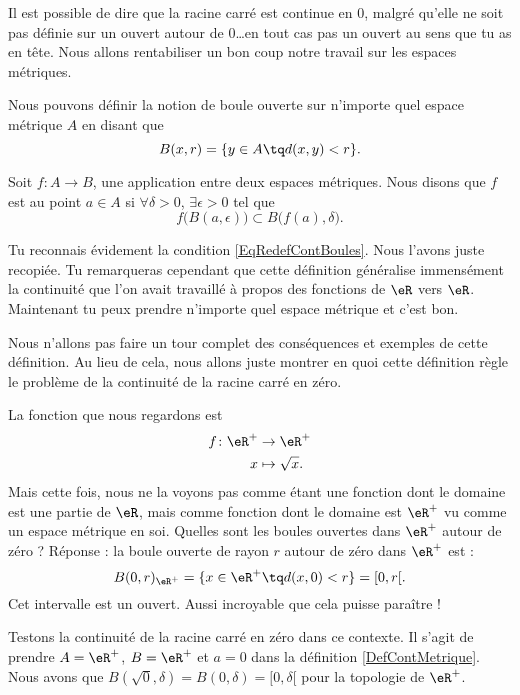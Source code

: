 Il est possible de dire que la racine carré est continue en $0$, malgré qu'elle ne soit pas définie sur un ouvert autour de $0$\ldots en tout cas pas un ouvert au sens que tu as en tête. Nous allons rentabiliser un bon coup notre travail sur les espaces métriques.

Nous pouvons définir la notion de boule ouverte sur n'importe quel espace métrique $A$ en disant que
\[ 
  B(x,r)=\{ y\in A\tq d(x,y)<r \}.
\]
\begin{definition}      \label{DefContMetrique}
Soit $f\colon A\to B$, une application entre deux espaces métriques. Nous disons que $f$ est  au point $a\in A$ si $\forall \delta>0$, $\exists\epsilon>0$ tel que 
\begin{equation}
  f\big( B(a,\epsilon) \big)\subset B\big( f(a),\delta \big).
\end{equation}
\end{definition}
Tu reconnais évidement la condition \eqref{EqRedefContBoules}. Nous l'avons juste recopiée. Tu remarqueras cependant que cette définition généralise immensément la continuité que l'on avait travaillé à propos des fonctions de $\eR$ vers $\eR$. Maintenant tu peux prendre n'importe quel espace métrique et c'est bon.

Nous n'allons pas faire un tour complet des conséquences et exemples de cette définition. Au lieu de cela, nous allons juste montrer en quoi cette définition règle le problème de la continuité de la racine carré en zéro.

La fonction que nous regardons est 
\begin{equation}
\begin{aligned}
f \colon \eR^+&\to \eR^+ \\ 
   x&\mapsto \sqrt{x}.
\end{aligned}
\end{equation}
Mais cette fois, nous ne la voyons pas comme étant une fonction dont le domaine est une partie de $\eR$, mais comme fonction dont le domaine est $\eR^+$ vu comme un espace métrique en soi. Quelles sont les boules ouvertes dans $\eR^+$ autour de zéro ? Réponse : la boule ouverte de rayon $r$ autour de zéro dans $\eR^+$ est :
\[ 
  B(0,r)_{\eR^+}=\{ x\in\eR^+\tq d(x,0)<r \}=[0,r[.  
\]
Cet intervalle est un ouvert. Aussi incroyable que cela puisse paraître !

Testons la continuité de la racine carré en zéro dans ce contexte. Il s'agit de prendre $A=\eR^+$, $B=\eR^+$ et $a=0$ dans la définition \ref{DefContMetrique}. Nous avons que $B(\sqrt{0},\delta)=B(0,\delta)=[0,\delta[$ pour la topologie de $\eR^+$.

